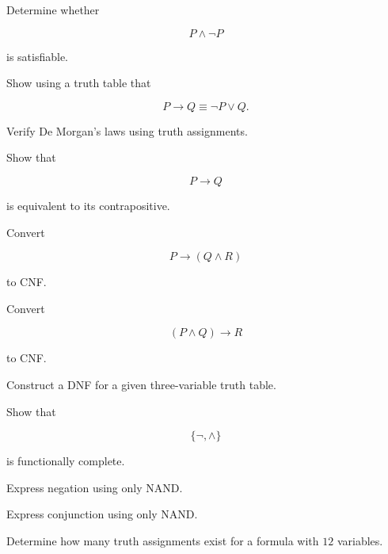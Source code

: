\begin{exercise}[2]
Determine whether

\[
P\land\neg P
\]

is satisfiable.
\end{exercise}

\begin{exercise}[2]
Show using a truth table that

\[
P\rightarrow Q
\equiv
\neg P\lor Q.
\]
\end{exercise}

\begin{exercise}[2]
Verify De Morgan's laws using truth assignments.
\end{exercise}

\begin{exercise}[2]
Show that

\[
P\rightarrow Q
\]

is equivalent to its contrapositive.
\end{exercise}

\begin{exercise}[3]
Convert

\[
P\rightarrow(Q\land R)
\]

to CNF.
\end{exercise}

\begin{exercise}[3]
Convert

\[
(P\land Q)\rightarrow R
\]

to CNF.
\end{exercise}

\begin{exercise}[3]
Construct a DNF for a given three-variable truth table.
\end{exercise}

\begin{exercise}[3]
Show that

\[
\{\neg,\land\}
\]

is functionally complete.
\end{exercise}

\begin{exercise}[3]
Express negation using only NAND.
\end{exercise}

\begin{exercise}[3]
Express conjunction using only NAND.
\end{exercise}

\begin{exercise}[3]
Determine how many truth assignments exist for a formula with \(12\)
variables.
\end{exercise}

